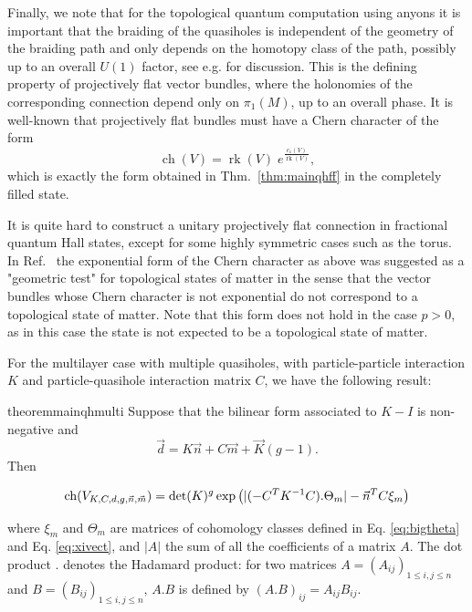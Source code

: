 \documentclass{article}
\theoremstyle{definition}
\DeclareMathOperator{\ch}{ch}
\DeclareMathOperator{\rk}{rk}
\newcommand{\eq}[2][1]{
\begin{equation*}
	\addtolength{\fboxsep}{0pt}
	\begin{alignedat}{#1}
	#2
	\end{alignedat}
\end{equation*}
}
\renewcommand{\leq}{\leqslant}
\begin{document}
Finally, we note that for the topological quantum computation using anyons \cite{Freedman_Kitaev_Larsen_Wang_2002,Kitaev_2003} it is important that the braiding of the quasiholes is independent of the geometry of the braiding path and only depends on the homotopy class of the path, possibly up to an overall $U(1)$ factor, see e.g. \cite{Read_2009,Nayak_Simon_Stern_Freedman_Sarma_2008} for discussion. This is the defining property of projectively flat vector bundles, where the holonomies of the corresponding connection depend only on $\pi_1(M)$, up to an overall phase. It is well-known that projectively flat bundles must have a Chern character of the form 
$$\ch(V)=\rk (V)\;e^{\frac{c_1(V)}{\rk(V)}},$$
which is exactly the form obtained in Thm.\ \ref{thm:mainqhff} in the completely filled state. 

It is quite hard to construct a unitary projectively flat connection in fractional quantum Hall states, except for some highly symmetric cases such as the torus. 
In Ref.\ \cite{Klevtsov_Zvonkine_2022} the exponential form of the Chern character as above was suggested as a "geometric test" for topological states of matter in the sense that the vector bundles whose Chern character is not exponential do not correspond to a topological state of matter. Note that this form does not hold in the case $p>0$, as in this case the state is not expected to be a topological state of matter. 


For the multilayer case with multiple quasiholes, with particle-particle interaction $K$ and particle-quasihole interaction matrix $C$, we have the following result: 



\begin{restatable}{theorem}{mainqhmulti}
\label{thm:mainqhmulti}
Suppose that the bilinear form associated to $K-I$ is non-negative and $$\vec{d}=K\vec{n}+C\vec{m}+\vec{K}(g-1).$$ Then 
\eq{
    \ch(V_{K,C,d,g,\vec{n},\vec{m}})=\det(K)^g \exp\left(|(-C^T K^{-1} C).\Theta_m| - \vec{n}^T C \xi_m\right)
    }
where $\xi_m$ and $\Theta_m$ are matrices of cohomology classes defined in Eq. \eqref{eq:bigtheta} and Eq. \eqref{eq:xivect}, and $|A|$ the sum of all the coefficients of a matrix $A$. The dot product $.$ denotes the Hadamard product: for two matrices $A=(A_{ij})_{1\leq i,j\leq n}$ and $B=(B_{ij})_{1\leq i,j\leq n}$, $A.B$ is defined by $(A.B)_{ij}=A_{ij}B_{ij}$. \end{restatable}
\end{document}
